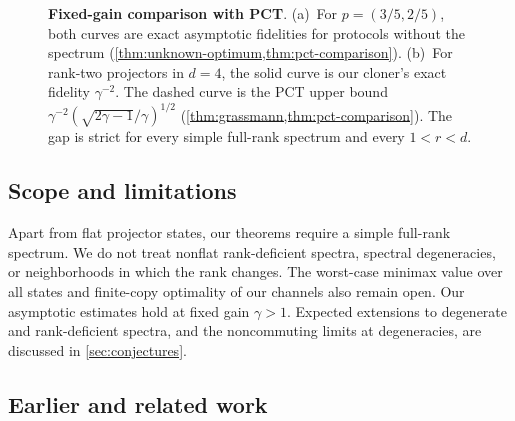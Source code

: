 \documentclass[11pt]{article}
\theoremstyle{remark}
\theoremstyle{plain}
\begin{document}
\begin{figure}[!htbp]
\caption{\textbf{Fixed-gain comparison with PCT}.
  \textup{(a)}~For \(p=(3/5,2/5)\), both curves are exact asymptotic
  fidelities for protocols without the spectrum
  (\cref{thm:unknown-optimum,thm:pct-comparison}).
  \textup{(b)}~For rank-two projectors in \(d=4\), the solid curve is
  our cloner's exact fidelity \(\gamma^{-2}\). The dashed curve is the
  PCT upper bound \(\gamma^{-2}(\sqrt{2\gamma-1}/\gamma)^{1/2}\)
  (\cref{thm:grassmann,thm:pct-comparison}).  The gap is strict for
  every simple full-rank spectrum and every \(1<r<d\).}
\label{fig:pct-comparisons}
\end{figure}

\subsection{Scope and limitations}
\label{sec:remarks}

Apart from flat projector states, our theorems require a simple full-rank
spectrum.  We do not treat nonflat rank-deficient spectra, spectral
degeneracies, or neighborhoods in which the rank changes.  The worst-case
minimax value over all states and finite-copy optimality of our channels
also remain open.  Our asymptotic estimates hold at fixed gain
\(\gamma>1\). Expected extensions to degenerate and rank-deficient spectra, and the
noncommuting limits at degeneracies, are discussed in \cref{sec:conjectures}.



\subsection{Earlier and related work}\label{sec:related-work}
\end{document}

